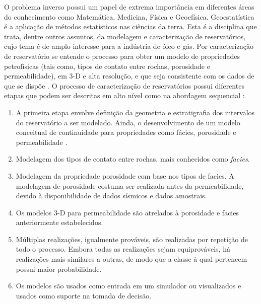 O problema inverso possui um papel de extrema importância em diferentes áreas do conhecimento
como Matemática, Medicina, Física e Geoefísica. Geoestatística é a aplicação de métodos
estatísticos nas ciências da terra. Esta é a disciplina que trata, dentre outros assuntos, da modelagem
e caracterização de reservatórios, cujo tema é de amplo interesse para a indústria de óleo
e gás. Por caracterização de reservatório se entende o processo para obter um modelo de propriedades
petrofísicas (tais como, tipos de contato entre rochas, porosidade e permeabilidade),
em 3-D e alta resolução, e que seja consistente com os dados de que se dispõe \citep{deutsch2002}.
O processo de caracterização de reservatórios possui diferentes
etapas que podem ser descritas em alto nível como na abordagem sequencial \citep{deutsch2002}:
\begin{enumerate}
 \item A primeira etapa envolve definição da geometria e estratigrafia dos intervalos do reservatório
 a ser modelado. Ainda, o desenvolvimento de um modelo conceitual de continuidade para
 propriedades como fácies, porosidade e permeabilidade \label{itm:1}.
 \item Modelagem dos tipos de contato entre rochas, mais conhecidos como \textit{facies}\label{itm:2}.
 \item Modelagem da propriedade porosidade com base nos tipos de facies. A modelagem de porosidade
 costuma ser realizada antes da permeabilidade, devido à disponibilidade de dados sísmicos e dados
 amostrais\label{itm:3}.
 \item Os modelos 3-D para permeabilidade são atrelados à porosidade e facies anteriormente estabelecidos\label{itm:4}.
 \item Múltiplas realizações, igualmente prováveis, são realizadas por repetição de todo o processo. Embora todas as
 realizações sejam equiprováveis, há realizações mais similares a outras, de modo que a classe à qual pertencem possui
 maior probabilidade\label{itm:5}.
 \item Os modelos são usados como entrada em um simulador ou visualizados e usados como suporte na tomada de decisão\label{itm:6}.
\end{enumerate}

